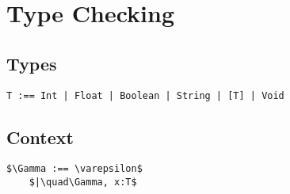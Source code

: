 \documentclass[11pt, a4paper]{article}
\begin{document}
\section{Type Checking}
\subsection*{Types}
\begin{lstlisting}
T :== Int | Float | Boolean | String | [T] | Void
\end{lstlisting}
\subsection*{Context}
\begin{lstlisting}
$\Gamma :== \varepsilon$
    $|\quad\Gamma, x:T$
\end{lstlisting}
\end{document}
